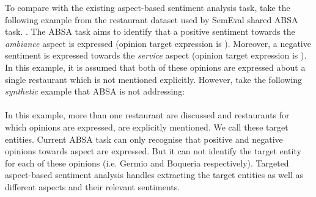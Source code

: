 \documentclass[11pt]{article}
\begin{document}
    To compare with the existing aspect-based sentiment analysis task, take the following example from the restaurant dataset used by SemEval shared ABSA~\cite{SemEval_2016_task5} task. . The ABSA task aims to identify that a positive sentiment towards the \textit{ambiance} aspect is expressed (opinion target expression is ). Moreover, a negative sentiment is expressed towards the \textit{service} aspect (opinion target expression is ). In this example, it is assumed that both of these opinions are expressed about a single restaurant which is not mentioned explicitly. However, take the following \emph{synthetic} example that ABSA is not addressing: \\
    
     \\
    
    In this example, more than one restaurant are discussed and restaurants for which opinions are expressed, are explicitly mentioned. We call these target entities. Current ABSA task can only recognise that positive and negative opinions towards aspect  are expressed. But it can not identify the target entity for each of these opinions (i.e. Germio and Boqueria respectively). Targeted aspect-based sentiment analysis handles extracting the target entities as well as different aspects and their relevant sentiments.
    
\end{document}
